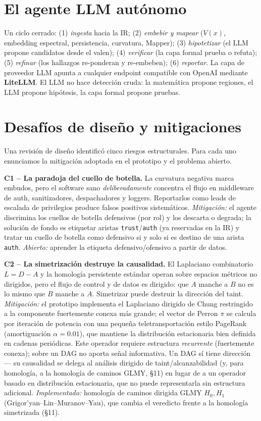 \documentclass[11pt]{article}
\begin{document}
\section{El agente LLM autónomo}
Un ciclo cerrado: (1) \emph{ingesta} hacia la IR; (2) \emph{embebir y mapear}
($V(x)$, embedding espectral, persistencia, curvatura, Mapper); (3)
\emph{hipotetizar} (el LLM propone candidatos desde el valen); (4)
\emph{verificar} (la capa formal prueba o refuta); (5) \emph{refinar} (los
hallazgos re-ponderan y re-embeben); (6) \emph{reportar}. La capa de proveedor
LLM apunta a cualquier endpoint compatible con OpenAI mediante \textbf{LiteLLM}.
El LLM no hace detección cruda: la matemática propone regiones, el LLM propone
hipótesis, la capa formal propone pruebas.

\section{Desafíos de diseño y mitigaciones}
Una revisión de diseño identificó cinco riesgos estructurales. Para cada uno
enunciamos la mitigación adoptada en el prototipo y el problema abierto.

\textbf{C1 -- La paradoja del cuello de botella.} La curvatura negativa marca
embudos, pero el software sano \emph{deliberadamente} concentra el flujo en
middleware de auth, sanitizadores, despachadores y loggers. Reportarlos como
leads de escalada de privilegios produce falsos positivos sistemáticos.
\emph{Mitigación:} el agente discrimina los cuellos de botella defensivos (por
rol) y los descarta o degrada; la solución de fondo es etiquetar aristas
\texttt{trust}/\texttt{auth} (ya reservadas en la IR) y tratar un cuello de
botella como defensivo si y solo si es destino de una arista \texttt{auth}.
\emph{Abierto:} aprender la etiqueta defensivo/ofensivo a partir de datos.

\textbf{C2 -- La simetrización destruye la causalidad.} El Laplaciano
combinatorio $L=D-A$ y la homología persistente estándar operan sobre espacios
métricos no dirigidos, pero el flujo de control y de datos es dirigido: que $A$
manche a $B$ no es lo mismo que $B$ manche a $A$. Simetrizar puede destruir la
dirección del taint. \emph{Mitigación:} el prototipo implementa el Laplaciano
dirigido de Chung restringido a la componente fuertemente conexa más grande; el
vector de Perron $\pi$ se calcula por iteración de potencia con una pequeña
teletransportación estilo PageRank (amortiguación $\alpha = 0.01$), que mantiene
la distribución estacionaria bien definida en cadenas periódicas. Este operador
requiere estructura \emph{recurrente} (fuertemente conexa); sobre un DAG no
aporta señal informativa. Un DAG sí tiene dirección --- su causalidad se delega
al análisis dirigido de taint/alcanzabilidad (y, para homología, a la homología
de caminos GLMY, \S11) en lugar de a un operador basado en distribución
estacionaria, que no puede representarla sin estructura adicional. \emph{Implementado:} homología de caminos dirigida
GLMY $H_0,H_1$ (Grigor'yan--Lin--Muranov--Yau), que cambia el veredicto frente a
la homología simetrizada (\S11).
\end{document}
